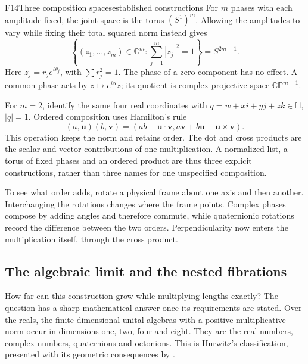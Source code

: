 \documentclass[11pt,a4paper]{article}
\newcommand{\C}{\mathbb{C}}
\newcommand{\HH}{\mathbb{H}}
\begin{document}
\begin{formal}{F14}{Three composition spaces}{established constructions}
For $m$ phases with each amplitude fixed, the joint space is the torus
$(S^1)^m$. Allowing the amplitudes to vary while fixing their total squared
norm instead gives
\begin{equation}\label{eq:sphere}
 \left\{(z_1,\ldots,z_m)\in\C^m:
 \sum_{j=1}^m|z_j|^2=1\right\}=S^{2m-1}.
\end{equation}
Here $z_j=r_je^{i\theta_j}$, with $\sum r_j^2=1$. The phase of a zero
component has no effect. A common phase acts by $z\mapsto e^{i\alpha}z$;
its quotient is complex projective space $\mathbb{CP}^{m-1}$.

For $m=2$, identify the same four real coordinates with
$q=w+xi+yj+zk\in\HH$, $|q|=1$. Ordered composition uses Hamilton's rule
\begin{equation}\label{eq:hamilton}
 (a,\mathbf u)(b,\mathbf v)=
 (ab-\mathbf u\!\cdot\!\mathbf v,
 a\mathbf v+b\mathbf u+\mathbf u\!\times\!\mathbf v).
\end{equation}
This operation keeps the norm and retains order. The dot and cross products
are the scalar and vector contributions of one multiplication. A normalized
list, a torus of fixed phases and an ordered product are thus three explicit
constructions, rather than three names for one unspecified composition.
\end{formal}

To see what order adds, rotate a physical frame about one axis and then
another. Interchanging the rotations changes where the frame points. Complex
phases compose by adding angles and therefore commute, while quaternionic
rotations record the difference between the two orders. Perpendicularity now
enters the multiplication itself, through the cross product.

\subsection{The algebraic limit and the nested fibrations}
How far can this construction grow while multiplying lengths exactly? The
question has a sharp mathematical answer once its requirements are stated.
Over the reals, the finite-dimensional unital algebras with a positive
multiplicative norm occur in dimensions one, two, four and eight. They are
the real numbers, complex numbers, quaternions and octonions. This is
Hurwitz's classification, presented with its geometric consequences by
\citet{Baez2002}.
\end{document}
